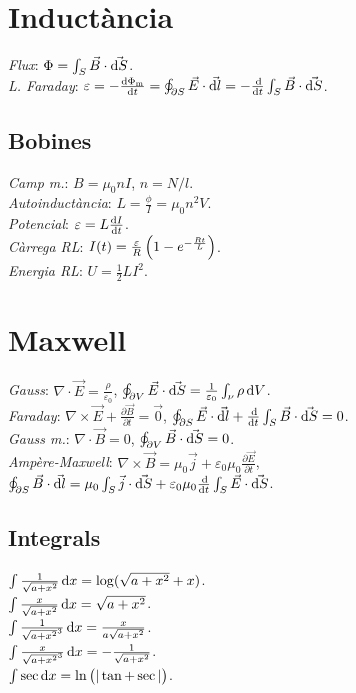 \section{Inductància}
\emph{Flux}: $\Phi = \int_S \vec{B}\cdot \vec{\dif S}$. \\
\emph{L. Faraday}: $\varepsilon = -\frac{\dif \Phi_{\text{m}}}{\dif t} = \oint_{\partial S} \vec{E} \cdot \vec{\dif l} = -\frac{\dif}{\dif t}\int_S \vec{B} \cdot \vec{\dif S}$.

\subsection{Bobines}
\emph{Camp m.}: $B = \mu_0 n I$, $n = N/l$.\\
\emph{Autoinductància}: $L = \frac{\phi}{I} = \mu_0 n^2 V$.\\
\emph{Potencial}: $\varepsilon = L \frac{\dif I}{\dif t}$.\\
\emph{Càrrega RL}: $I(t) = \frac{\varepsilon}{R} \left( 1 - e^{-\frac{Rt}{L}}\right)$.\\
\emph{Energia RL}: $U = \frac{1}{2}LI^2$.

\section{Maxwell}
\emph{Gauss}: $\nabla \cdot \vec{E} = \frac{\rho}{\varepsilon_0} $, $\oint_{\partial V} \vec{E}\cdot \vec{\dif S} = \frac{1}{\varepsilon_0} \int_\nu \rho \dif V$.\\
\emph{Faraday}: $\nabla \times \vec{E} +  \frac{\partial{\vec{B}}}{\partial t} = \vec{0}$,
                $\oint_{\partial S} \vec{E} \cdot \vec{\dif l} + 
                \frac{\dif}{\dif t} \int_S \vec{B} \cdot \vec{\dif S} = 0$.\\
\emph{Gauss m.}: $\nabla \cdot \vec{B} = 0$, $\oint_{\partial V} \vec{B} \cdot
                \vec{\dif S} = 0$.\\
\emph{Ampère-Maxwell}: $\nabla \times \vec{B} = \mu_0 \vec{j} + \varepsilon_0\mu_0
                    \frac{\partial{\vec{E}}}{\partial t}$, $\oint_{\partial{S}}
                    \vec{B} \cdot \vec{\dif l} = \mu_0 
                    \int_S \vec{j} \cdot \vec{\dif S} + \varepsilon_0 \mu_0
                    \frac{\dif}{\dif t} \int_S \vec{E} \cdot \vec{\dif S}$.

\addtocounter{section}{1}
\noindent\makebox[\linewidth]{\rule{\linewidth}{0.5pt}}

\subsection{Integrals}
\ci $\int \frac{1}{\sqrt{a+x^2}}\dif x = \log (\sqrt{a+x^2} + x)$. \\
\ci $\int \frac{x}{\sqrt{a+x^2}}\dif x = \sqrt{a+x^2}$. \\
\ci $\int \frac{1}{\sqrt{a+x^2}^3}\dif x = \frac{x}{a\sqrt{a+x^2}}$. \\
\ci $\int \frac{x}{\sqrt{a+x^2}^3}\dif x = -\frac{1}{\sqrt{a+x^2}}$.\\
\ci $\int \sec \dif x = \ln \lp |\tan + \sec| \rp$.

